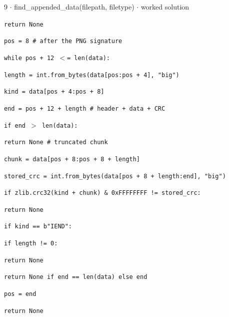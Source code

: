 \documentclass[11pt]{article}
\begin{document}
\begin{keepsection}
\begin{workedbox}{9 \ensuremath{\cdot} find\_appended\_data(filepath, filetype) \ensuremath{\cdot} worked solution}
\begin{enumerate}
\begin{tcolorbox}[colback=Paperblue,colframe=Paperblue,boxrule=0pt,arc=0pt,left=7pt,right=7pt,top=5pt,bottom=5pt]
\noindent\hspace*{1em}\texttt{return None}\par
\noindent\hspace*{0em}\texttt{pos = 8 \# after the PNG signature}\par
\noindent\hspace*{0em}\texttt{while pos + 12 \ensuremath{<}= len(data):}\par
\noindent\hspace*{1em}\texttt{length = int.from\_bytes(data[pos:pos + 4], "big")}\par
\noindent\hspace*{1em}\texttt{kind = data[pos + 4:pos + 8]}\par
\noindent\hspace*{1em}\texttt{end = pos + 12 + length \# header + data + CRC}\par
\noindent\hspace*{1em}\texttt{if end \ensuremath{>} len(data):}\par
\noindent\hspace*{3em}\texttt{return None \# truncated chunk}\par
\noindent\hspace*{1em}\texttt{chunk = data[pos + 8:pos + 8 + length]}\par
\noindent\hspace*{1em}\texttt{stored\_crc = int.from\_bytes(data[pos + 8 + length:end], "big")}\par
\noindent\hspace*{1em}\texttt{if zlib.crc32(kind + chunk) \& 0xFFFFFFFF != stored\_crc:}\par
\noindent\hspace*{3em}\texttt{return None}\par
\noindent\hspace*{1em}\texttt{if kind == b"IEND":}\par
\noindent\hspace*{3em}\texttt{if length != 0:}\par
\noindent\hspace*{5em}\texttt{return None}\par
\noindent\hspace*{3em}\texttt{return None if end == len(data) else end}\par
\noindent\hspace*{1em}\texttt{pos = end}\par
\noindent\hspace*{0em}\texttt{return None}\par
\end{tcolorbox}
\end{enumerate}
\end{workedbox}

\end{keepsection}
\end{document}
